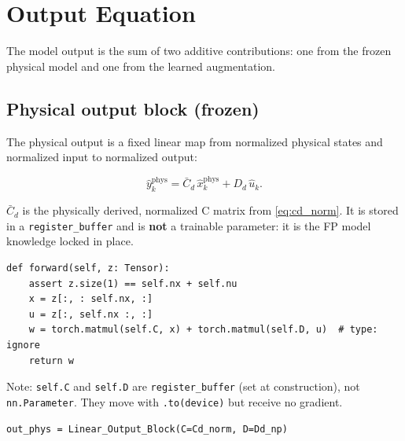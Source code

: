 \documentclass[11pt,a4paper]{article}
\newcommand{\code}[1]{\texttt{#1}}
\newcommand{\codetitle}[2]{\small\texttt{#1}\quad lines #2}
\begin{document}
\section{Output Equation}
\label{sec:output}

The model output is the sum of two additive contributions:
one from the frozen physical model and one from the learned augmentation.

\subsection{Physical output block (frozen)}

The physical output is a fixed linear map from normalized physical states
and normalized input to normalized output:

\begin{equation}
  \hat{y}_k^{\mathrm{phys}} = \bar{C}_d\, \hat{x}_k^{\mathrm{phys}}
                             + D_d\, \hat{u}_k.
  \label{eq:y_phys}
\end{equation}

$\bar{C}_d$ is the physically derived, normalized C matrix from
\eqref{eq:cd_norm}.
It is stored in a \code{register\_buffer} and is \textbf{not} a trainable
parameter: it is the FP model knowledge locked in place.

\begin{lstlisting}[style=py,
  title={\codetitle{model\_augmentation/fit\_systems/blocks.py}{119--124} -- \texttt{Linear\_Output\_Block.forward()}},
  firstnumber=119]
def forward(self, z: Tensor):
    assert z.size(1) == self.nx + self.nu
    x = z[:, : self.nx, :]
    u = z[:, self.nx :, :]
    w = torch.matmul(self.C, x) + torch.matmul(self.D, u)  # type: ignore
    return w
\end{lstlisting}

Note: \code{self.C} and \code{self.D} are \code{register\_buffer}
(set at construction), not \code{nn.Parameter}.
They move with \code{.to(device)} but receive no gradient.

\begin{lstlisting}[style=py,
  title={\codetitle{gantry\_interconnect\_dynamic.py}{243}},
  firstnumber=243]
out_phys = Linear_Output_Block(C=Cd_norm, D=Dd_np)
\end{lstlisting}

\end{document}
